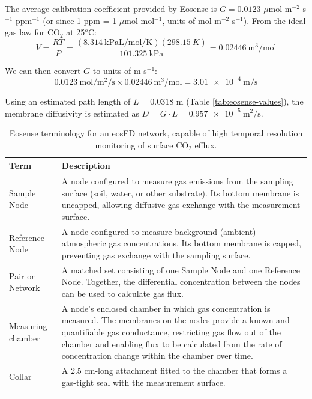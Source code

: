 \documentclass[11pt]{article}
\begin{document}
The average calibration coefficient provided by Eosense is $G = 0.0123$ $\mu$mol m$^{-2}$ s$^{-1}$ ppm$^{-1}$ (or since 1 ppm = 1 $\mu$mol mol$^{-1}$, units of mol m$^{-2}$ s$^{-1}$). From the ideal gas law for CO$_2$ at 25$^o$C:
\begin{equation*}
	V = \frac{RT}{P} = \frac{(\SI{8.314}{\kPa\L\per\mol\per\K})({\SI{298.15}{K}})}{\SI{101.325}{\kPa}} = \SI{0.02446}{\cubic\m\per\mol}
\end{equation*}

We can then convert $G$ to units of m s$^{-1}$:
\begin{equation*}
	\SI{0.0123}{\mol\per\square\m\per\s} \times \SI{0.02446}{\cubic\m\per\mol} = \boxed{ \SI{3.01e-4}{\m\per\s}}
\end{equation*}

Using an estimated path length of $L = 0.0318$ m (Table \ref{tab:eosense-values}), the membrane diffusivity is estimated as $D = G \cdot 
L = \SI{0.957e-5}{\square\m\per\s}$.

\begin{table}[H]
	\caption{Eosense terminology for an eosFD network, capable of high temporal resolution monitoring of surface CO$_2$ efflux.}
	\begin{tabularx}{\textwidth}{lX}
		\hline
		\textbf{Term} & \textbf{Description} \\
		\hline
		Sample Node & A node configured to measure gas emissions from the sampling surface (soil, water, or other substrate). Its bottom membrane is uncapped, allowing diffusive gas exchange with the measurement surface. \\
		
		Reference Node & A node configured to measure background (ambient) atmospheric gas concentrations. Its bottom membrane is capped, preventing gas exchange with the sampling surface. \\
		
		Pair or Network & A matched set consisting of one Sample Node and one Reference Node. Together, the differential concentration between the nodes can be used to calculate gas flux. \\
		
		Measuring chamber & A node's enclosed chamber in which gas concentration is measured. The membranes on the nodes provide a known and quantifiable gas conductance, restricting gas flow out of the chamber and enabling flux to be calculated from the rate of concentration change within the chamber over time.\\
		
		Collar & A 2.5 cm-long attachment fitted to the chamber that forms a gas-tight seal with the measurement surface. \\
		
		\hline
		\label{tab:terminology}
	\end{tabularx}
\end{table}
\end{document}

